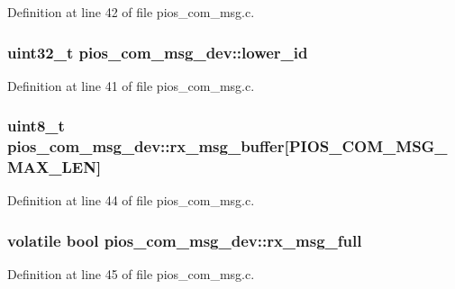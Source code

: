 \-Definition at line 42 of file pios\-\_\-com\-\_\-msg.\-c.

\hypertarget{structpios__com__msg__dev_a08cc90d0b7c8cd94cd589c948234869b}{
\subsubsection[{lower\-\_\-id}]{\setlength{\rightskip}{0pt plus 5cm}uint32\-\_\-t {\bf pios\-\_\-com\-\_\-msg\-\_\-dev\-::lower\-\_\-id}}}\label{structpios__com__msg__dev_a08cc90d0b7c8cd94cd589c948234869b}


\-Definition at line 41 of file pios\-\_\-com\-\_\-msg.\-c.

\hypertarget{structpios__com__msg__dev_ab1901ce323a85aa3e31dc1b965b0ce01}{
\subsubsection[{rx\-\_\-msg\-\_\-buffer}]{\setlength{\rightskip}{0pt plus 5cm}uint8\-\_\-t {\bf pios\-\_\-com\-\_\-msg\-\_\-dev\-::rx\-\_\-msg\-\_\-buffer}\mbox{[}\-P\-I\-O\-S\-\_\-\-C\-O\-M\-\_\-\-M\-S\-G\-\_\-\-M\-A\-X\-\_\-\-L\-E\-N\mbox{]}}}\label{structpios__com__msg__dev_ab1901ce323a85aa3e31dc1b965b0ce01}


\-Definition at line 44 of file pios\-\_\-com\-\_\-msg.\-c.

\hypertarget{structpios__com__msg__dev_a38043f348bd99edfb297de34bda052e4}{
\subsubsection[{rx\-\_\-msg\-\_\-full}]{\setlength{\rightskip}{0pt plus 5cm}volatile bool {\bf pios\-\_\-com\-\_\-msg\-\_\-dev\-::rx\-\_\-msg\-\_\-full}}}\label{structpios__com__msg__dev_a38043f348bd99edfb297de34bda052e4}


\-Definition at line 45 of file pios\-\_\-com\-\_\-msg.\-c.

